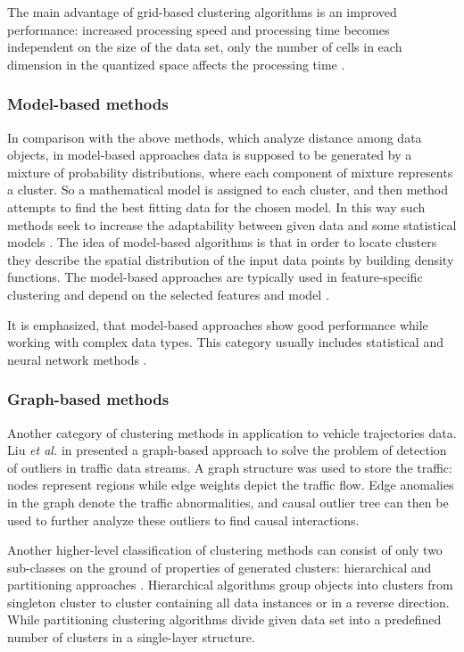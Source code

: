 The main advantage of grid-based clustering algorithms is an improved performance: increased processing speed and processing time becomes independent on the size of the data set, only the number of cells in each dimension in the quantized space affects the processing time \cite{article:8_review_mot_cl_alg}.

\subsubsection{Model-based methods}

In comparison with the above methods, which analyze distance among data objects, in model-based approaches data is supposed to be generated by a mixture of probability distributions, where each component of mixture represents a cluster. So a mathematical model is assigned to each cluster, and then method attempts to find the best fitting data for the chosen model. In this way such methods seek to increase the adaptability between given data and some statistical models \cite{article:8_review_mot_cl_alg}\cite{article:22_survey_dscc}. The idea of model-based algorithms is that in order to locate clusters they describe the spatial distribution of the input data points by building density functions. The model-based approaches are typically used in feature-specific clustering and depend on the selected features and model \cite{article:5_survey_tbsa}.

It is emphasized, that model-based approaches show good performance while working with complex data types. This category usually includes statistical and neural network methods \cite{article:8_review_mot_cl_alg}.

\subsubsection{Graph-based methods \cite{article:1_survey_stdm}}

Another category of clustering methods in application to vehicle trajectories data. Liu \textit{et al.} in \cite{inproceedings:26_dstci_tds} presented a graph-based approach to solve the problem of detection of outliers in traffic data streams. A graph structure was used to store the traffic: nodes represent regions while edge weights depict the traffic flow. Edge anomalies in the graph denote the traffic abnormalities, and causal outlier tree can then be used to further analyze these outliers to find causal interactions.

\bigbreak
Another higher-level classification of clustering methods can consist of only two sub-classes on the ground of properties of generated clusters: hierarchical and partitioning approaches \cite{article:23_survey_ca}. Hierarchical algorithms group objects into clusters from singleton cluster to cluster containing all data instances or in a reverse direction. While partitioning clustering algorithms divide given data set into a predefined number of clusters in a single-layer structure.

